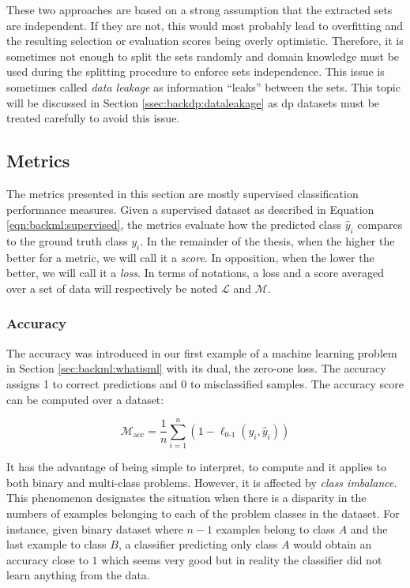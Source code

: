 These two approaches are based on a strong assumption that the extracted sets are
independent. If they are not, this would most probably lead to overfitting and
the resulting selection or evaluation scores being overly optimistic. Therefore,
it is sometimes not enough to split the sets randomly and domain knowledge must
be used during the splitting procedure to enforce sets independence. This issue
is sometimes called \textit{data leakage} \cite{kaufman2012leakage} as
information ``leaks'' between the sets. This topic will be discussed in Section
\ref{ssec:backdp:dataleakage} as \acrlong{dp} datasets must be treated carefully 
to avoid this issue.

\subsection{Metrics}
\label{ssec:backml:metrics}

The metrics presented in this section are mostly supervised classification
performance measures. Given a supervised dataset as described in Equation
\ref{eqn:backml:supervised}, the metrics evaluate how the predicted class $\hat{y}_i$
compares to the ground truth class $y_i$. In the remainder of the thesis, when
the higher the better for a metric, we will call it a \textit{score}. In opposition,
when the lower the better, we will call it a \textit{loss}. In terms of notations,
a loss and a score averaged over a set of data will respectively be noted
$\mathcal{L}$ and $\mathcal{M}$.

\subsubsection{Accuracy}
\label{sssec:backml:metric:acc}
The accuracy was introduced in our first example of a machine learning problem in
Section \ref{sec:backml:whatisml} with its dual, the zero-one loss. The accuracy
assigns 1 to correct predictions and 0 to misclassified samples. The accuracy
score can be computed over a dataset:

\begin{equation}
\label{eqn:backml:accuracy}
\mathcal{M}_{\text{acc}} = \dfrac{1}{n} \sum\limits_{i = 1}^n (1 - \ell_{\text{0-1}}(y_i, \hat{y}_i))
\end{equation}

It has the advantage of being simple to interpret, to compute and it applies to
both binary and multi-class problems. However, it is affected by \textit{class imbalance}.
This phenomenon designates the situation when there is a disparity in the numbers
of examples belonging to each of the problem classes in the dataset. For instance,
given binary dataset where $n-1$ examples belong to class $A$ and the last example
to class $B$, a classifier predicting only class $A$ would obtain an accuracy
close to $1$ which seems very good but in reality the classifier did not learn
anything from the data.

